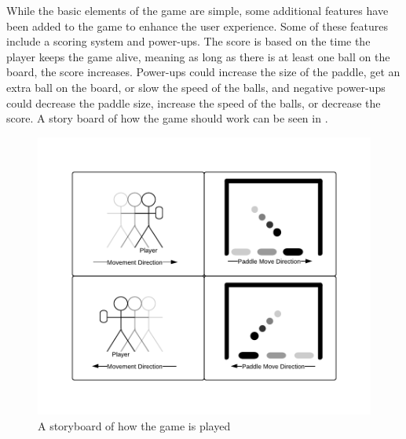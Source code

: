 While the basic elements of the game are simple, some additional features have been added to the game to enhance the user experience.
Some of these features include a scoring system and power-ups.
The score is based on the time the player keeps the game alive, meaning as long as there is at least one ball on the board, the score increases.
Power-ups could increase the size of the paddle, get an extra ball on the board, or slow the speed of the balls, and negative power-ups could decrease the paddle size, increase the speed of the balls, or decrease the score.
A story board of how the game should work can be seen in .
\begin{figure}[H]
	\centering
	\includegraphics[trim = 0cm 1.5cm 0cm 1.5cm, clip, scale = 0.75]{media/design/story-board.pdf}
	\caption{A storyboard of how the game is played}
	\label{figure:story-board}
\end{figure}


